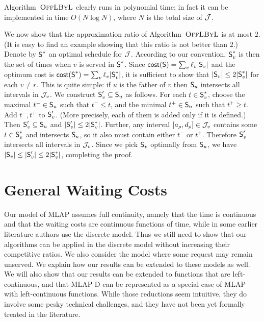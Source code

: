 \documentclass[a4paper]{article}
\newcommand{\calJ}{{\cal J}}
\newcommand{\cost}{\mbox{\rm\textsf{cost}}}
\newcommand{\length}{\ell}
\newcommand{\algLBL}{\mbox{\sc OffLByL}}
\newcommand{\MLAP}{\mbox{\rm\textsf{MLAP}}}
\newcommand{\MLAPD}{\mbox{\rm\textsf{MLAP-D}}}
\newcommand{\schedS}{\mbox{\rm\textsf{S}}}
\newcommand{\optschedS}{\mbox{\rm\textsf{S}}^\ast}
\begin{document}
\medskip


Algorithm~$\algLBL$ clearly runs in polynomial time; in fact it can be implemented in time 
$O(N\log N)$, where $N$ is the total size of $\calJ$.

We now show that the approximation ratio of Algorithm~$\algLBL$ is at most $2$. (It is easy to find an
example showing that this ratio is not better than $2$.)
Denote by $\optschedS$ an optimal schedule for $\calJ$. According to our
convention, $\optschedS_v$ is then the set of times when $v$ is served in $\optschedS$. Since
$\cost(\schedS) = \sum_v \length_v|\schedS_v|$ and the optimum cost 
is $\cost(\optschedS) = \sum_v \length_v|\optschedS_v|$, it
is sufficient to show that $|\schedS_v|\le 2|\optschedS_v|$ for each $v\neq r$.
This is quite simple: if $u$ is the father of $v$ then $\schedS_u$ intersects all intervals in $\calJ_v$. 
We construct $\schedS'_v\subseteq \schedS_u$ as follows.
For each $t\in \optschedS_v$, choose the maximal $t^-\in \schedS_u$ such that  $t^-\le t$, and
the minimal $t^+\in \schedS_u$ such that  $t^+\ge t$.
Add $t^-, t^+$ to $\schedS'_v$. (More precisely, each of them is added only if it is defined.)
Then  $\schedS'_v\subseteq \schedS_u$ and $|\schedS'_v| \le 2|\optschedS_v|$.
Further, any interval $[a_\rho,d_\rho]\in \calJ_v$ contains some $t\in \optschedS_v$ and intersects $\schedS_u$,
so it also must contain either $t^-$ or $t^+$. Therefore  $\schedS'_v$ intersects all intervals in $\calJ_v$. Since
we pick $\schedS_v$ optimally from $\schedS_u$, we have $|\schedS_v|\le |\schedS'_v| \le  2|\optschedS_v|$,
completing the proof.



\section{General Waiting Costs}
\label{sec: general waiting costs}

Our model of {\MLAP} assumes full continuity, namely that the time is
continuous and that the waiting costs are continuous functions of
time, while in some earlier literature authors use the discrete model.
Thus we still need to show that our algorithms can be applied in the
discrete model without increasing their competitive ratios. We also
consider the model where some request may remain unserved.  We
explain how our results can be extended to these models as well. 
We will also show that our results can be extended to functions that
are left-continuous, and that {\MLAPD} can be represented as a special
case of {\MLAP} with left-continuous functions. While those reductions
seem intuitive, they do involve some pesky technical challenges, and they
have not been yet formally treated in the literature.
\end{document}
